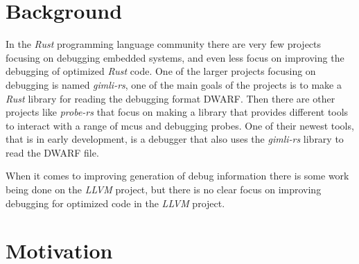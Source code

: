 \section{Background}
In the \emph{Rust} programming language community there are very few projects focusing on debugging embedded systems, and even less focus on improving the debugging of optimized \emph{Rust} code.
One of the larger projects focusing on debugging is named \emph{gimli-rs}, one of the main goals of the projects is to make a \emph{Rust} library for reading the debugging format \gls{DWARF}.
Then there are other projects like \emph{probe-rs} that focus on making a library that provides different tools to interact with a range of \glspl{mcu} and debugging probes.
One of their newest tools, that is in early development, is a debugger that also uses the \emph{gimli-rs} library to read the \gls{DWARF} file.

When it comes to improving generation of debug information there is some work being done on the \emph{LLVM} project, but there is no clear focus on improving debugging for optimized code in the \emph{LLVM} project.


\section{Motivation}



